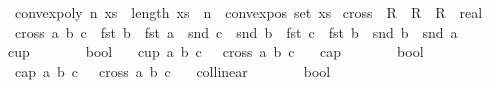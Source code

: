 \begin{isabellebody}
\ \ {\isachardoublequoteopen}convex{\isacharunderscore}{\kern0pt}poly\ n\ xs\ {\isasymequiv}\ length\ xs\ {\isacharequal}{\kern0pt}\ n\ {\isasymand}\ convex{\isacharunderscore}{\kern0pt}pos\ {\isacharparenleft}{\kern0pt}set\ xs{\isacharparenright}{\kern0pt}{\isachardoublequoteclose}\isanewline
\isanewline
{}\isamarkupfalse%
\ cross{}\ {\isacharcolon}{\kern0pt}{\isacharcolon}{\kern0pt}\ {\isachardoublequoteopen}R{}\ {\isasymRightarrow}\ R{}\ {\isasymRightarrow}\ R{}\ {\isasymRightarrow}\ real{\isachardoublequoteclose}\ \isanewline
\ \ {\isachardoublequoteopen}cross{}\ a\ b\ c\ {\isacharequal}{\kern0pt}\ {\isacharparenleft}{\kern0pt}fst\ b\ {\isacharminus}{\kern0pt}\ fst\ a{\isacharparenright}{\kern0pt}\ {\isacharasterisk}{\kern0pt}\ {\isacharparenleft}{\kern0pt}snd\ c\ {\isacharminus}{\kern0pt}\ snd\ b{\isacharparenright}{\kern0pt}\ {\isacharminus}{\kern0pt}\ {\isacharparenleft}{\kern0pt}fst\ c\ {\isacharminus}{\kern0pt}\ fst\ b{\isacharparenright}{\kern0pt}\ {\isacharasterisk}{\kern0pt}\ {\isacharparenleft}{\kern0pt}snd\ b\ {\isacharminus}{\kern0pt}\ snd\ a{\isacharparenright}{\kern0pt}{\isachardoublequoteclose}\isanewline
\isanewline
{}\isamarkupfalse%
\ cup{}\ {\isacharcolon}{\kern0pt}{\isacharcolon}{\kern0pt}\ {\isachardoublequoteopen}{\isacharunderscore}{\kern0pt}\ {\isasymRightarrow}\ {\isacharunderscore}{\kern0pt}\ {\isasymRightarrow}\ {\isacharunderscore}{\kern0pt}\ {\isasymRightarrow}\ bool{\isachardoublequoteclose}\ \isanewline
\ \ {\isachardoublequoteopen}cup{}\ a\ b\ c\ {\isasymequiv}\ \ cross{}\ a\ b\ c\ {\isachargreater}{\kern0pt}\ {}{\isachardoublequoteclose}\isanewline
\isanewline
{}\isamarkupfalse%
\ cap{}\ {\isacharcolon}{\kern0pt}{\isacharcolon}{\kern0pt}\ {\isachardoublequoteopen}{\isacharunderscore}{\kern0pt}\ {\isasymRightarrow}\ {\isacharunderscore}{\kern0pt}\ {\isasymRightarrow}\ {\isacharunderscore}{\kern0pt}\ {\isasymRightarrow}\ bool{\isachardoublequoteclose}\ \isanewline
\ \ {\isachardoublequoteopen}cap{}\ a\ b\ c\ {\isasymequiv}\ \ cross{}\ a\ b\ c\ {\isacharless}{\kern0pt}\ {}{\isachardoublequoteclose}\isanewline
\isanewline
{}\isamarkupfalse%
\ collinear{}\ {\isacharcolon}{\kern0pt}{\isacharcolon}{\kern0pt}\ {\isachardoublequoteopen}{\isacharunderscore}{\kern0pt}\ {\isasymRightarrow}\ {\isacharunderscore}{\kern0pt}\ {\isasymRightarrow}\ {\isacharunderscore}{\kern0pt}\ {\isasymRightarrow}\ bool{\isachardoublequoteclose}\ \isanewline

\end{isabellebody}
